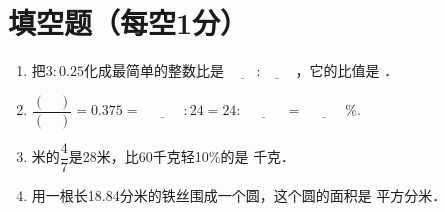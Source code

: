 \documentclass[12pt,twoside,space]{ctexart}
\begin{document}
\juemi %

  \section{填空题（每空1分）}
    \begin{enumerate}[itemsep=0.2em,topsep=0pt]
      \item 把$3:0.25$化成最简单的整数比是 $\underline{\hspace{2em}}: \underline{\hspace{2em}}$ ，它的比值是 \underline{\hspace{3em}}．
      \item $\dfrac{(\hspace{1em})}{(\hspace{1em})}=0.375=\underline{\hspace{3em}}:24=24:\underline{\hspace{3em}}=\underline{\hspace{3em}}\%$.
      \item  \underline{\hspace{3em}}米的$\dfrac{4}{7}$是28米，比60千克轻10\%的是 \underline{\hspace{3em}} 千克．
      \item 用一根长18.84分米的铁丝围成一个圆，这个圆的面积是 \underline{\hspace{3em}} 平方分米．
    \end{enumerate}
\end{document}
